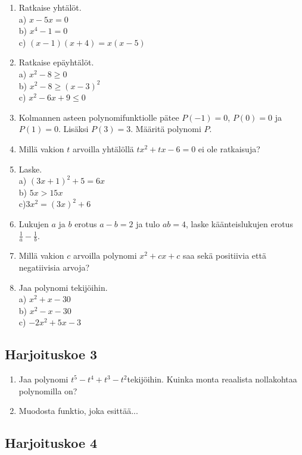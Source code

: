 \begin{enumerate}
\item Ratkaise yhtälöt.\\ a) $x-5x=0$\\ b) $x^4-1=0$\\ c) $(x-1)(x+4) = x(x-5)$
\item Ratkaise epäyhtälöt.\\ a) $x^2-8\geq0$\\ b) $x^2-8\geq(x-3)^2$\\ c) $x^2-6x+9\leq0$
\item Kolmannen asteen polynomifunktiolle pätee $P(-1)=0$, $P(0)=0$ ja $P(1)=0$. Lisäksi $P(3)=3$. Määritä polynomi $P$. %
\item Millä vakion $t$ arvoilla yhtälöllä $tx^2+tx-6=0$ ei ole ratkaisuja?
\item Laske. \\ a) $(3x+1)^2+5=6x$\\ b) $5x>15x$\\ c)$3x^2=(3x)^2+6$ 
\item Lukujen $a$ ja $b$ erotus $a-b=2$ ja tulo $ab=4$, laske käänteislukujen erotus $\frac{1}{a}-\frac{1}{b}$.
\item Millä vakion $c$ arvoilla polynomi $x^2+cx+c$ saa sekä positiivia että negatiivisia arvoja?
\item Jaa polynomi tekijöihin.\\ a) $x^2+x-30$\\ b)  $x^2-x-30$\\ c)  $-2x^2+5x-3$ 
\end{enumerate}


\subsection*{Harjoituskoe 3}

\begin{enumerate}
\item Jaa polynomi $t^5-t^4+t^3-t^2$tekijöihin. Kuinka monta reaalista nollakohtaa polynomilla on?
\item Muodosta funktio, joka esittää...
\end{enumerate}


\subsection*{Harjoituskoe 4}

